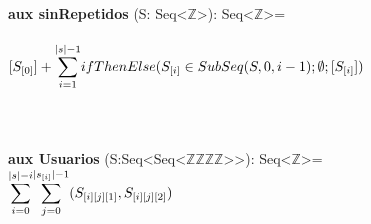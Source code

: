 \documentclass{article}
\newcommand{\Entero}{$\mathds{Z}$}
\newcommand{\tuplaDeTuplaDeCuatroEnteros}{{Seq\textless Seq\textless\Entero\texttimes\Entero\texttimes\Entero\texttimes\Entero\textgreater\textgreater}}
\begin{document}
    \textbf{aux sinRepetidos} (S: Seq\textless$\mathds{Z}$\textgreater): Seq\textless$\mathds{Z}$\textgreater =\\\\
        \indent\indent $[S_{[0]}] + \mathlarger\sum\limits_{i=1}^{|s|-1} ifThenElse(S_{[i]} \in SubSeq(S, 0, i-1); \emptyset; [S_{[i]}])$ \\\\\\\\

    \textbf{aux Usuarios} (S:\tuplaDeTuplaDeCuatroEnteros): Seq\textless$\mathds{Z}$\textgreater=\\

    \indent\indent $\mathlarger\sum\limits_{i=0}^{|s|-i} \mathlarger\sum\limits_{j=0}^{|s_{[i]}|-1} (S_{[i][j][1]}, S_{[i][j][2]})$\\\\\\
\end{document}
